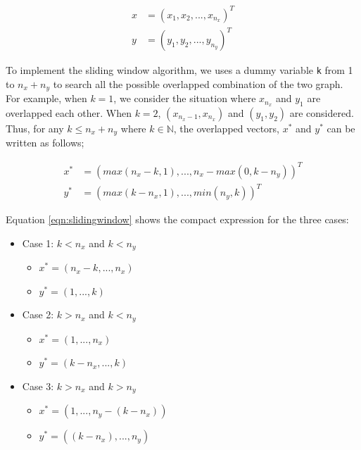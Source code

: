 \documentclass[letterpaper,9pt,twocolumn,twoside,]{pinp}
\providecommand{\tightlist}{%
  \setlength{\itemsep}{0pt}\setlength{\parskip}{0pt}}
\begin{document}
\begin{equation*}
  \begin{aligned}
    x & = (x_1, x_2, ..., x_{n_x})^T \\
    y & = (y_1, y_2, ..., y_{n_y})^T
  \label{eqn:speedvector} 
  \end{aligned}
\end{equation*}

To implement the sliding window algorithm, we uses a dummy variable
\texttt{k} from 1 to \(n_x + n_y\) to search all the possible overlapped
combination of the two graph. For example, when \(k = 1\), we consider
the situation where \(x_{n_x}\) and \(y_1\) are overlapped each other.
When \(k=2\), \((x_{n_x - 1}, x_{n_x})\) and \((y_1, y_2)\) are
considered. Thus, for any \(k \leq n_x+n_y\) where \(k \in \mathbb{N}\),
the overlapped vectors, \(x^*\) and \(y^*\) can be written as follows;

\begin{equation}
  \begin{aligned}
  x^* &= (max(n_x - k, 1), ..., n_x - max(0, k - n_y))^T \\
  y^* &= (max(k-n_x, 1), ..., min(n_y, k))^T
  \label{eqn:slidingwindow} 
  \end{aligned}
\end{equation}

Equation \ref{eqn:slidingwindow} shows the compact expression for the
three cases:

\begin{itemize}
\tightlist
\item
  Case 1: \(k < n_x\) and \(k < n_y\)

  \begin{itemize}
  \tightlist
  \item
    \(x^* = (n_x - k, ..., n_x)\)
  \item
    \(y^* = (1, ..., k)\)
  \end{itemize}
\item
  Case 2: \(k > n_x\) and \(k < n_y\)

  \begin{itemize}
  \tightlist
  \item
    \(x^* = (1, ..., n_x)\)
  \item
    \(y^* = (k-n_x, ..., k)\)
  \end{itemize}
\item
  Case 3: \(k > n_x\) and \(k > n_y\)

  \begin{itemize}
  \tightlist
  \item
    \(x^* = (1, ..., n_y - (k-n_x))\)
  \item
    \(y^* = ((k-n_x), ..., n_y)\)
  \end{itemize}
\end{itemize}
\end{document}
